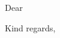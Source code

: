 \documentclass[12 pt]{letter}
\begin{document}
\begin{letter}{
  }
\opening{Dear}




\closing{Kind regards,}

\end{letter}
\end{document}
